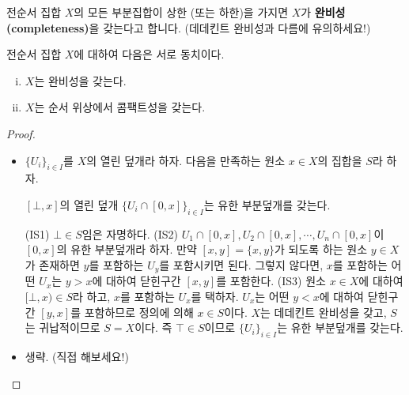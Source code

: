 \documentclass[serif]{beamer}
\begin{document}
\begin{frame}{}
    전순서 집합 $X$의 모든 부분집합이 상한 (또는 하한)을 가지면 $X$가 \textbf{완비성(completeness)}을 갖는다고 합니다. (데데킨트 완비성과 다름에 유의하세요!)
    \begin{thm*}{}
        전순서 집합 $X$에 대하여 다음은 서로 동치이다.
        \begin{enumerate}[(i)]
            \item $X$는 완비성을 갖는다.
            \item $X$는 순서 위상에서 콤팩트성을 갖는다.
        \end{enumerate}
    \end{thm*}
    \begin{proof}
        \begin{itemize}
            \item[($\Rightarrow$)] $\{U_i\}_{i\in I}$를 $X$의 열린 덮개라 하자. 다음을 만족하는 원소 $x\in X$의 집합을 $S$라 하자.
                \begin{center}
                    $[\bot,x]$의 열린 덮개 $\{U_i\cap[0,x]\}_{i\in I}$는 유한 부분덮개를 갖는다.
                \end{center}
                (IS1) $\bot\in S$임은 자명하다. (IS2) $U_1\cap[0,x], U_2\cap[0,x], \cdots, U_n\cap[0,x]$이 $[0,x]$의 유한 부분덮개라 하자. 만약 $[x,y]=\{x,y\}$가 되도록 하는 원소 $y\in X$가 존재하면 $y$를 포함하는 $U_y$를 포함시키면 된다. 그렇지 않다면, $x$를 포함하는 어떤 $U_x$는 $y>x$에 대하여 닫힌구간 $[x,y]$를 포함한다. (IS3) 원소 $x\in X$에 대하여 $[\bot,x)\in S$라 하고, $x$를 포함하는 $U_x$를 택하자. $U_x$는 어떤 $y<x$에 대하여 닫힌구간 $[y,x]$를 포함하므로 정의에 의해 $x\in S$이다. $X$는 데데킨트 완비성을 갖고, $S$는 귀납적이므로 $S=X$이다. 즉 $\top\in S$이므로 $\{U_i\}_{i\in I}$는 유한 부분덮개를 갖는다.
            \item[($\Leftarrow$)] 생략. (직접 해보세요!) \qedhere
        \end{itemize}
    \end{proof}
\end{frame}
\end{document}
